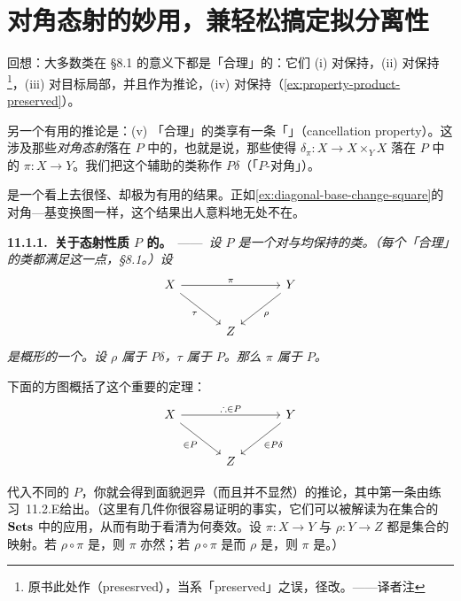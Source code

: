 
\section{对角态射的妙用，兼轻松搞定拟分离性}

回想：大多数\trMorphism{}类在 \S8.1 的意义下都是「合理」的：它们 (i) 对\trComposition{}保持，(ii) 对\trBaseChange{}保持\footnote{原书此处作（presesrved），当系「preserved」之误，径改。——译者注}，(iii) 对目标局部，并且作为推论，(iv) 对\trProduct{}保持（\cref{ex:property-product-preserved}）。

另一个有用的推论是：(v) 「合理」的\trMorphism{}类享有一条「\trCancellationProperty{}」（cancellation property）。这涉及那些\emph{对角态射}落在 $P$ 中的\trMorphism，也就是说，那些使得 $\delta_\pi\colon X\to X\times_Y X$ 落在 $P$ 中的\trMorphism{} $\pi\colon X\to Y$。我们把这个辅助的\trMorphism{}类称作 $P\delta$（「$P$-对角」）。

\trCancellationTheorem{}是一个看上去很怪、却极为有用的结果。正如\cref{ex:diagonal-base-change-square}的对角—基变换图一样，这个结果出人意料地无处不在。

\textbf{11.1.1.\ 关于态射性质 $P$ 的\trCancellationTheorem{}。}\ ——\ \emph{设 $P$ 是一个对\trBaseChange{}与\trComposition{}均保持的\trMorphism{}类。（每个「合理」的\trMorphism{}类都满足这一点，\S8.1。）设}
\[
\begin{tikzcd}[row sep=2.4em, column sep=3.2em]
X \ar[rr, "\pi"] \ar[dr, "\tau"'] & & Y \ar[dl, "\rho"] \\
& Z &
\end{tikzcd}
\]
\emph{是概形的一个\trCommutativeDiagram。设 $\rho$ 属于 $P\delta$，$\tau$ 属于 $P$。那么 $\pi$ 属于 $P$。}

下面的方图概括了这个重要的定理：
\[
\begin{tikzcd}[row sep=2.4em, column sep=3.2em]
X \ar[rr, "\therefore\in P"] \ar[dr, "\in P"'] & & Y \ar[dl, "\in P\delta"] \\
& Z &
\end{tikzcd}
\]

代入不同的 $P$，你就会得到面貌迥异（而且并不显然）的推论，其中第一条由\mbox{练习~11.2.E}给出。（这里有几件你很容易证明的事实，它们可以被解读为\trCancellationTheorem{}在集合的\trCategory{} $\mathbf{Sets}$ 中的应用，从而有助于看清\trCancellationTheorem{}为何奏效。设 $\pi\colon X\to Y$ 与 $\rho\colon Y\to Z$ 都是集合的映射。若 $\rho\circ\pi$ 是\trInjectiveMap，则 $\pi$ 亦然；若 $\rho\circ\pi$ 是\trSurjectiveMap{}而 $\rho$ 是\trInjectiveMap，则 $\pi$ 是\trSurjectiveMap。）

